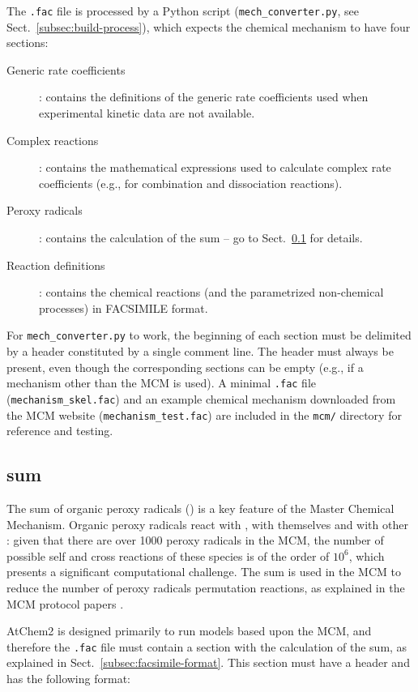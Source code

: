The \texttt{.fac} file is processed by a Python script
(\texttt{mech\_converter.py}, see Sect.~\ref{subsec:build-process}),
which expects the chemical mechanism to have four sections:

\begin{description}
\item[Generic rate coefficients] : contains the definitions of the
  generic rate coefficients used when experimental kinetic data are
  not available.
\item[Complex reactions] : contains the mathematical expressions used
  to calculate complex rate coefficients (e.g., for combination and
  dissociation reactions).
\item[Peroxy radicals] : contains the calculation of the  sum
  -- go to Sect.~\ref{subsec:ro2-sum} for details.
\item[Reaction definitions] : contains the chemical reactions (and the
  parametrized non-chemical processes) in FACSIMILE format.
\end{description}

For \texttt{mech\_converter.py} to work, the beginning of each section
must be delimited by a header constituted by a single comment line.
The header must always be present, even though the corresponding
sections can be empty (e.g., if a mechanism other than the MCM is
used). A minimal \texttt{.fac} file (\texttt{mechanism\_skel.fac}) and
an example chemical mechanism downloaded from the MCM website
(\texttt{mechanism\_test.fac}) are included in the \texttt{mcm/}
directory for reference and testing.

\subsection{ sum} \label{subsec:ro2-sum}

The sum of organic peroxy radicals () is a key feature of the
Master Chemical Mechanism. Organic peroxy radicals react with
, with themselves and with other : given that there
are over 1000 peroxy radicals in the MCM, the number of possible self
and cross reactions of these species is of the order of $10^6$, which
presents a significant computational challenge. The  sum is
used in the MCM to reduce the number of peroxy radicals permutation
reactions, as explained in the MCM protocol papers
\citep{jenkin_1997, saunders_2003}.

AtChem2 is designed primarily to run models based upon the MCM, and
therefore the \texttt{.fac} file must contain a section with the
calculation of the  sum, as explained in
Sect.~\ref{subsec:facsimile-format}. This section must have a header
and has the following format:

